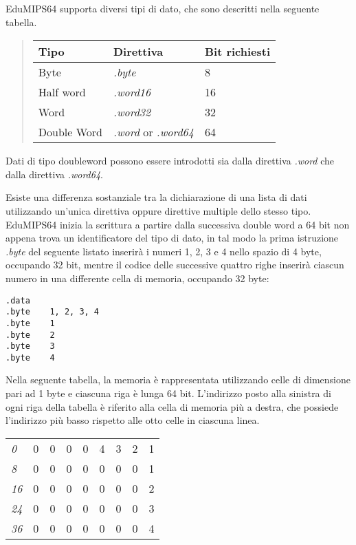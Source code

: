 \documentclass[letterpaper,10pt,italian]{sphinxmanual}
\begin{document}
EduMIPS64 supporta diversi tipi di dato, che sono descritti nella seguente
tabella.
\begin{quote}

\begin{tabulary}{\linewidth}{|L|L|L|}
\hline
\textbf{
Tipo
} & \textbf{
Direttiva
} & \textbf{
Bit richiesti
}\\
\hline

Byte
 & 
\emph{.byte}
 & 
8
\\

Half word
 & 
\emph{.word16}
 & 
16
\\

Word
 & 
\emph{.word32}
 & 
32
\\

Double Word
 & 
\emph{.word} or \emph{.word64}
 & 
64
\\
\hline
\end{tabulary}

\end{quote}

Dati di tipo doubleword possono essere introdotti sia dalla direttiva
\emph{.word} che dalla direttiva \emph{.word64}.

Esiste una differenza sostanziale tra la dichiarazione di una lista di dati
utilizzando un'unica direttiva oppure direttive multiple dello stesso tipo.
EduMIPS64 inizia la scrittura a partire dalla successiva double word a 64 bit non appena
trova un identificatore del tipo di dato, in tal modo la prima istruzione \emph{.byte}
del seguente listato inserirà i numeri 1, 2, 3 e 4 nello spazio di 4 byte,
occupando 32 bit, mentre il codice delle successive quattro righe inserirà ciascun numero
in una differente cella di memoria, occupando 32 byte:

\begin{Verbatim}[commandchars=@\[\]]
.data
.byte    1, 2, 3, 4
.byte    1
.byte    2
.byte    3
.byte    4
\end{Verbatim}

Nella seguente tabella, la memoria è rappresentata utilizzando celle di dimensione pari
ad 1 byte e ciascuna riga è lunga 64 bit. L'indirizzo posto alla sinistra di ogni riga della tabella è
riferito alla cella di memoria più a destra, che possiede l'indirizzo più basso rispetto alle otto celle in ciascuna linea.

\begin{tabulary}{\linewidth}{|L|L|L|L|L|L|L|L|L|}
\hline

\emph{0}
 & 
0
 & 
0
 & 
0
 & 
0
 & 
4
 & 
3
 & 
2
 & 
1
\\

\emph{8}
 & 
0
 & 
0
 & 
0
 & 
0
 & 
0
 & 
0
 & 
0
 & 
1
\\

\emph{16}
 & 
0
 & 
0
 & 
0
 & 
0
 & 
0
 & 
0
 & 
0
 & 
2
\\

\emph{24}
 & 
0
 & 
0
 & 
0
 & 
0
 & 
0
 & 
0
 & 
0
 & 
3
\\

\emph{36}
 & 
0
 & 
0
 & 
0
 & 
0
 & 
0
 & 
0
 & 
0
 & 
4
\\
\hline
\end{tabulary}
\end{document}
